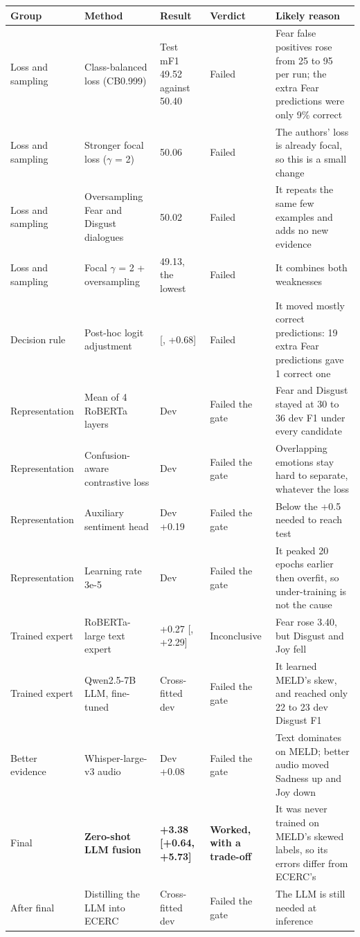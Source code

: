 \documentclass[11pt,a4paper]{article}
\newcommand{\mn}{\textminus}
\begin{document}
{\footnotesize
\begin{longtable}{L{2cm}L{3.5cm}L{3.4cm}L{2.1cm}L{4.5cm}}
\toprule
Group & Method & Result & Verdict & Likely reason \\
\midrule
\endhead
\bottomrule
\endlastfoot
Loss and sampling & Class-balanced loss (CB0.999) & Test mF1 49.52 against 50.40 & Failed & Fear false positives rose from 25 to 95 per run; the extra Fear predictions were only 9\% correct \\
Loss and sampling & Stronger focal loss ($\gamma$ = 2) & 50.06 & Failed & The authors' loss is already focal, so this is a small change \\
Loss and sampling & Oversampling Fear and Disgust dialogues & 50.02 & Failed & It repeats the same few examples and adds no new evidence \\
Loss and sampling & Focal $\gamma$ = 2 + oversampling & 49.13, the lowest & Failed & It combines both weaknesses \\
Decision rule & Post-hoc logit adjustment & \mn0.24 [\mn1.06, +0.68] & Failed & It moved mostly correct predictions: 19 extra Fear predictions gave 1 correct one \\
Representation & Mean of 4 RoBERTa layers & Dev \mn0.07 & Failed the gate & Fear and Disgust stayed at 30 to 36 dev F1 under every candidate \\
Representation & Confusion-aware contrastive loss & Dev \mn0.22 & Failed the gate & Overlapping emotions stay hard to separate, whatever the loss \\
Representation & Auxiliary sentiment head & Dev +0.19 & Failed the gate & Below the +0.5 needed to reach test \\
Representation & Learning rate 3e-5 & Dev \mn0.06 & Failed the gate & It peaked 20 epochs earlier then overfit, so under-training is not the cause \\
Trained expert & RoBERTa-large text expert & +0.27 [\mn1.92, +2.29] & Inconclusive & Fear rose 3.40, but Disgust and Joy fell \\
Trained expert & Qwen2.5-7B LLM, fine-tuned & Cross-fitted dev \mn0.98 & Failed the gate & It learned MELD's skew, and reached only 22 to 23 dev Disgust F1 \\
Better evidence & Whisper-large-v3 audio & Dev +0.08 & Failed the gate & Text dominates on MELD; better audio moved Sadness up and Joy down \\
Final & \textbf{Zero-shot LLM fusion} & \textbf{+3.38 [+0.64, +5.73]} & \textbf{Worked, with a trade-off} & It was never trained on MELD's skewed labels, so its errors differ from ECERC's \\
After final & Distilling the LLM into ECERC & Cross-fitted dev \mn0.42 & Failed the gate & The LLM is still needed at inference \\
\end{longtable}
}
\end{document}
